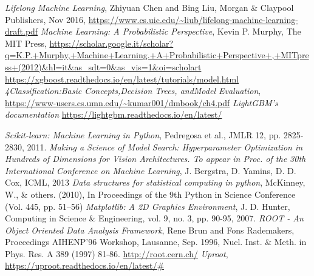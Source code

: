 \documentclass[a4paper, oneside, 11pt, openright]{book}
\begin{document}
\begin{thebibliography}{32}
			 \textit{Lifelong Machine Learning}, Zhiyuan Chen and Bing Liu, Morgan \& Claypool Publishers, Nov 2016, \url{https://www.cs.uic.edu/~liub/lifelong-machine-learning-draft.pdf}
			 \textit{Machine Learning: A Probabilistic Perspective}, Kevin P. Murphy, The MIT Press, \url{https://scholar.google.it/scholar?q=K.P.+Murphy,+Machine+Learning.+A+Probabilistic+Perspective+,+MITpress+(2012)&hl=it&as_sdt=0&as_vis=1&oi=scholart}
			 \url{https://xgboost.readthedocs.io/en/latest/tutorials/model.html}
			 \textit{4Classification:Basic Concepts,Decision Trees, andModel Evaluation}, \url{https://www-users.cs.umn.edu/~kumar001/dmbook/ch4.pdf}
			 \textit{LightGBM’s documentation} 
			\url{https://lightgbm.readthedocs.io/en/latest/}
			
			
			\textit{Scikit-learn: Machine Learning in Python}, Pedregosa et al., JMLR 12, pp. 2825-2830, 2011.
			\textit{Making a Science of Model Search: Hyperparameter Optimization in Hundreds of Dimensions for Vision Architectures. To appear in Proc. of the 30th International Conference on Machine Learning}, J. Bergstra, D. Yamins, D. D. Cox, ICML, 2013
			\textit{Data structures for statistical computing in python},
			McKinney, W., \& others. (2010), In Proceedings of the 9th Python in Science Conference (Vol. 445, pp. 51–56)
			\textit{Matplotlib: A 2D Graphics Environment}, J. D. Hunter, Computing in Science \& Engineering, vol. 9, no. 3, pp. 90-95, 2007.
			\textit{ROOT - An Object Oriented Data Analysis Framework}, Rene Brun and Fons Rademakers, Proceedings AIHENP'96 Workshop, Lausanne, Sep. 1996, Nucl. Inst. \& Meth. in Phys. Res. A 389 (1997) 81-86. \url{http://root.cern.ch/}
			\textit{Uproot}, \url{https://uproot.readthedocs.io/en/latest/#}
			
	\end{thebibliography}
\end{document}
